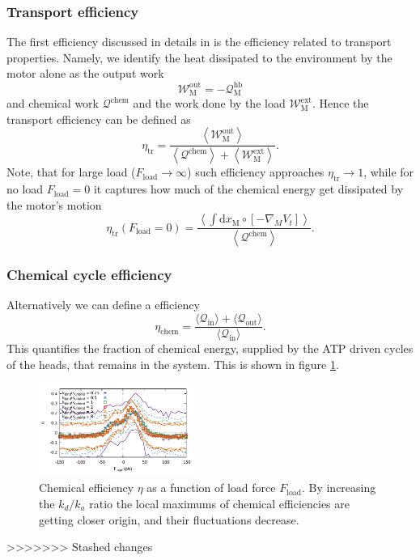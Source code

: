\documentclass[aps,pre,twocolumn,showpacs,showkeys]{revtex4-1}
\newcommand{\rmd}{{\mathrm d}}
\begin{document}
\subsubsection{Transport efficiency} 
The first efficiency discussed in details in \cite{} %
is the efficiency related to transport properties. 
Namely, we identify the heat dissipated to the environment by the motor alone as the output work 
\[
{\mathcal W}^\text{out}_\text{M} = - {\mathcal Q}^\text{hb}_\text{M} 
\] 
and chemical work $\mathcal Q^\text{chem}$ and the work done by the load $\mathcal W^\text{ext}_\text{M}$.
Hence the transport efficiency can be defined as 
\[
\eta_\text{tr} = \frac{ \left\langle {\mathcal W}^\text{out}_\text{M} \right\rangle }{ \left\langle {\mathcal Q}^\text{chem} \right\rangle + \left\langle {\mathcal W}^\text{ext}_\text{M} \right\rangle } .
\]
Note, that for large load ($F_\text{load} \to \infty$) such efficiency approaches $\eta_\text{tr} \to 1$, 
while for no load $F_\text{load} = 0$ it captures how much of the chemical energy get dissipated by the motor's motion  
\[
\eta_\text{tr}( F_\text{load} = 0 ) = \frac{ \left\langle \int \rmd x_\text{M} \circ \left[ - \nabla_M V_t \right] \right\rangle }{ \left\langle {\mathcal Q}^\text{chem} \right\rangle } .
\]



\subsubsection{Chemical cycle efficiency}
Alternatively we can define a efficiency 
\begin{equation}
\eta_\text{chem} = \frac{\langle\mathcal Q_\text{in}\rangle+\langle\mathcal Q_\text{out}\rangle}{\langle\mathcal Q_\text{in}\rangle} .
\label{eq:efficiency}
\end{equation}
This quantifies the fraction of chemical energy, supplied by the ATP driven cycles of the heads, that remains in the system. 
This is shown in figure \ref{Fig: chem}.
\begin{figure}[b]
\centering
\includegraphics[width=0.45\textwidth,height=!]{chemical_cycle}
\caption{Chemical efficiency $\eta$ as a function of load force $F_\text{load}$.
By increasing the $k_d/k_a$ ratio the local maximums of chemical efficiencies are getting closer origin,
and their fluctuations decrease. 
}
\label{Fig: chem}
\end{figure}
>>>>>>> Stashed changes
\end{document}
